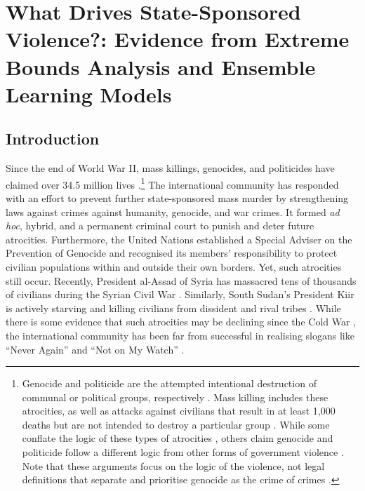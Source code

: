 \chapter{What Drives State-Sponsored Violence?: Evidence from Extreme Bounds Analysis and Ensemble Learning Models}
\label{chap:killings}

\section{Introduction}
\label{sec:intro4}

Since the end of World War II, mass killings, genocides, and politicides have claimed over 34.5 million lives \citep{marshall2017pitf}.\footnote{Genocide and politicide are the attempted intentional destruction of communal or political groups, respectively \citep[see][]{harff1988toward}. Mass killing includes these atrocities, as well as attacks against civilians that result in at least 1,000 deaths but are not intended to destroy a particular group \citep[see][]{ulfelder2008assessing}. While some conflate the logic of these types of atrocities \citep[e.g.,][]{stanton2015regulating, valentino2004draining}, others claim genocide and politicide follow a different logic from other forms of government violence \citep{kalyvas2006logic,stanton2015regulating}. Note that these arguments focus on the logic of the violence, not legal definitions that separate and prioritise genocide as the crime of crimes \citep[see][]{schabas2000genocide}.} The international community has responded with an effort to prevent further state-sponsored mass murder by strengthening laws against crimes against humanity, genocide, and war crimes. It formed \textit{ad hoc}, hybrid, and a permanent criminal court to punish and deter future atrocities. Furthermore, the United Nations established a Special Adviser on the Prevention of Genocide and recognised its members’ responsibility to protect civilian populations within and outside their own borders. Yet, such atrocities still occur. Recently, President al-Assad of Syria has massacred tens of thousands of civilians during the Syrian Civil War \citep{goldman2017nyt}. Similarly, South Sudan's President Kiir is actively starving and killing civilians from dissident and rival tribes \citep{nichols2017reuters}. While there is some evidence that such atrocities may be declining since the Cold War \citep{valentino2014we}, the international community has been far from successful in realising slogans like ``Never Again'' and ``Not on My Watch'' \citep{cheadle2007not}.


